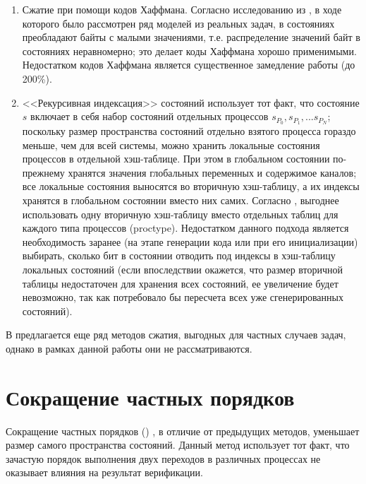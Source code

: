 \begin{enumerate}
\item Сжатие при помощи кодов Хаффмана. Согласно исследованию из
  \cite{StateCompr}, в ходе которого было рассмотрен ряд моделей из
  реальных задач, в состояниях преобладают байты с малыми значениями,
  т.е. распределение значений байт в состояниях неравномерно; это
  делает коды Хаффмана хорошо применимыми. Недостатком кодов Хаффмана
  является существенное замедление работы (до 200\%).

\item <<Рекурсивная индексация>> состояний использует тот факт, что
  состояние $s$ включает в себя набор состояний отдельных процессов
  $s_{P_0}, s_{P_1}, ... s_{P_N}$; поскольку размер пространства состояний
  отдельно взятого процесса гораздо меньше, чем для всей системы,
  можно хранить локальные состояния процессов в отдельной
  хэш-таблице. При этом в глобальном состоянии по-прежнему хранятся
  значения глобальных переменных и содержимое каналов; все локальные
  состояния выносятся во вторичную хэш-таблицу, а их индексы хранятся
  в глобальном состоянии вместо них самих. Согласно \cite{StateCompr},
  выгоднее использовать одну вторичную хэш-таблицу вместо отдельных
  таблиц для каждого типа процессов (proctype). Недостатком данного
  подхода является необходимость заранее (на этапе генерации кода или
  при его инициализации) выбирать, сколько бит в состоянии отводить
  под индексы в хэш-таблицу локальных состояний (если впоследствии
  окажется, что размер вторичной таблицы недостаточен для хранения
  всех состояний, ее увеличение будет невозможно, так как потребовало
  бы пересчета всех уже сгенерированных состояний).
\end{enumerate}

В \cite{StateCompr} предлагается еще ряд методов сжатия, выгодных для
частных случаев задач, однако в рамках данной работы они не
рассматриваются. 

\section{Сокращение частных порядков}
\label{sec:partial-order-reduction}

Сокращение частных порядков () \cite{POD}, в
отличие от предыдущих методов, уменьшает размер самого пространства
состояний. Данный метод использует тот факт, что зачастую порядок
выполнения двух переходов в различных процессах не оказывает влияния
на результат верификации. 

